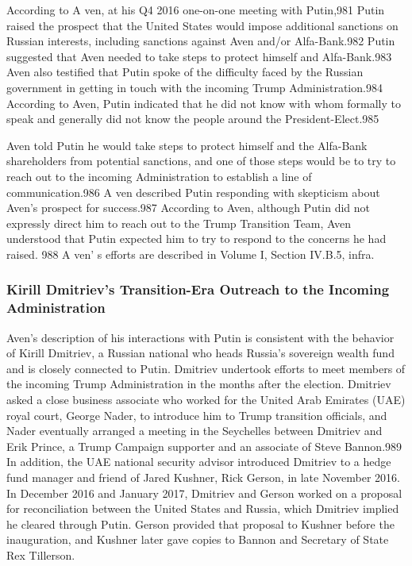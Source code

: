 According to A ven, at his Q4 2016 one-on-one meeting with Putin,981 Putin raised the prospect that the United States would impose additional sanctions on Russian interests, including sanctions against Aven and/or Alfa-Bank.982 Putin suggested that Aven needed to take steps to protect himself and Alfa-Bank.983 Aven also testified that Putin spoke of the difficulty faced by the Russian government in getting in touch with the incoming Trump Administration.984 According to Aven, Putin indicated that he did not know with whom formally to speak and generally did not know the people around the President-Elect.985

Aven told Putin he would take steps to protect himself and the Alfa-Bank shareholders from potential sanctions, and one of those steps would be to try to reach out to the incoming Administration to establish a line of communication.986 A ven described Putin responding with skepticism about Aven's prospect for success.987 According to Aven, although Putin did not expressly direct him to reach out to the Trump Transition Team, Aven understood that Putin expected him to try to respond to the concerns he had raised. 988 A ven' s  efforts are described in Volume I,  Section IV.B.5, infra.

\subsubsection{Kirill Dmitriev's Transition-Era Outreach to the Incoming Administration}

Aven's description of his interactions with Putin is  consistent with the behavior of Kirill Dmitriev, a Russian national who heads Russia's sovereign wealth fund and is closely connected to Putin. Dmitriev undertook efforts to meet members of the incoming Trump Administration in the months after the election. Dmitriev asked a close business associate who worked for the United Arab Emirates (UAE) royal court,  George Nader, to introduce him to Trump transition officials, and Nader eventually arranged a  meeting in the Seychelles between Dmitriev and Erik Prince, a Trump Campaign supporter and an associate of Steve Bannon.989 In addition, the UAE national security advisor introduced Dmitriev to a hedge fund manager and friend of Jared Kushner, Rick Gerson, in late November 2016. In December 2016 and January 2017, Dmitriev and Gerson worked on a  proposal for reconciliation between the United States and Russia, which Dmitriev implied he cleared through Putin. Gerson provided that proposal to Kushner before the inauguration, and Kushner later gave copies to Bannon and Secretary of State Rex Tillerson.

